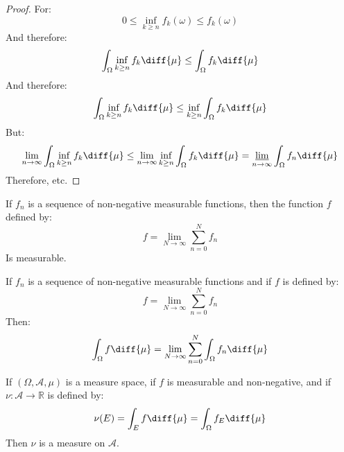     \begin{proof}
        For:
        \begin{equation}
            0\leq\inf_{k\geq{n}}f_{k}(\omega)
            \leq{f}_{k}(\omega)
        \end{equation}
        And therefore:
        \begin{equation}
            \int_{\Omega}\inf_{k\geq{n}}f_{k}\diff{\mu}
            \leq\int_{\Omega}f_{k}\diff{\mu}
        \end{equation}
        And therefore:
        \begin{equation}
            \int_{\Omega}\inf_{k\geq{n}}f_{k}\diff{\mu}
            \leq\inf_{k\geq{n}}\int_{\Omega}f_{k}\diff{\mu}
        \end{equation}
        But:
        \begin{equation}
            \underset{n\rightarrow\infty}{\lim}
            \int_{\Omega}\inf_{k\geq{n}}f_{k}\diff{\mu}
            \leq
            \underset{n\rightarrow\infty}{\lim}
            \inf_{k\geq{n}}\int_{\Omega}f_{k}\diff{\mu}
            =\underset{n\rightarrow\infty}{\underline{\lim}}
            \int_{\Omega}f_{n}\diff{\mu}
        \end{equation}
        Therefore, etc.
    \end{proof}
    \begin{theorem}
        If $f_{n}$ is a sequence of non-negative measurable functions,
        then the function $f$ defined by:
        \begin{equation}
            f=\underset{N\rightarrow\infty}{\lim}
            \sum_{n=0}^{N}f_{n}
        \end{equation}
        Is measurable.
    \end{theorem}
    \begin{theorem}
        If $f_{n}$ is a sequence of non-negative measurable functions
        and if $f$ is defined by:
        \begin{equation}
            f=\underset{N\rightarrow\infty}{\lim}
            \sum_{n=0}^{N}f_{n}
        \end{equation}
        Then:
        \begin{equation}
            \int_{\Omega}f\diff{\mu}=
            \underset{N\rightarrow\infty}{\lim}
            \sum_{n=0}^{N}\int_{\Omega}f_{n}\diff{\mu}
        \end{equation}
    \end{theorem}
    \begin{theorem}
        If $(\Omega,\mathcal{A},\mu)$ is a measure space,
        if $f$ is measurable and non-negative, and if
        $\nu:\mathcal{A}\rightarrow\mathbb{R}$ is defined by:
        \begin{equation}
            \nu(E)=\int_{E}f\diff{\mu}=
            \int_{\Omega}f_{E}\diff{\mu}
        \end{equation}
        Then $\nu$ is a measure on $\mathcal{A}$.
    \end{theorem}

